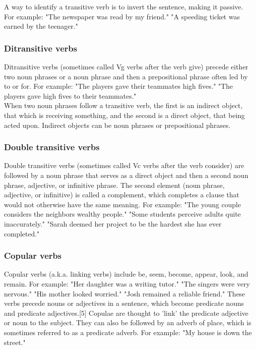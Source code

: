 A way to identify a transitive verb is to invert the sentence, making it passive. For example: "The newspaper was read by my friend." "A speeding ticket was earned by the teenager."

\subsubsection{Ditransitive verbs \cite{wiki-verb}}
Ditransitive verbs (sometimes called Vg verbs after the verb give) precede either two noun phrases or a noun phrase and then a prepositional phrase often led by to or for. For example: "The players gave their teammates high fives." "The players gave high fives to their teammates." \\

When two noun phrases follow a transitive verb, the first is an indirect object, that which is receiving something, and the second is a direct object, that being acted upon. Indirect objects can be noun phrases or prepositional phrases.


\subsubsection{Double transitive verbs \cite{wiki-verb}}
Double transitive verbs (sometimes called Vc verbs after the verb consider) are followed by a noun phrase that serves as a direct object and then a second noun phrase, adjective, or infinitive phrase. The second element (noun phrase, adjective, or infinitive) is called a complement, which completes a clause that would not otherwise have the same meaning. For example: "The young couple considers the neighbors wealthy people." "Some students perceive adults quite inaccurately." "Sarah deemed her project to be the hardest she has ever completed."

\subsubsection{Copular verbs \cite{wiki-verb}}
Copular verbs (a.k.a. linking verbs) include be, seem, become, appear, look, and remain. For example: "Her daughter was a writing tutor." "The singers were very nervous." "His mother looked worried." "Josh remained a reliable friend." These verbs precede nouns or adjectives in a sentence, which become predicate nouns and predicate adjectives.[5] Copulae are thought to 'link' the predicate adjective or noun to the subject. They can also be followed by an adverb of place, which is sometimes referred to as a predicate adverb. For example: "My house is down the street." \\

